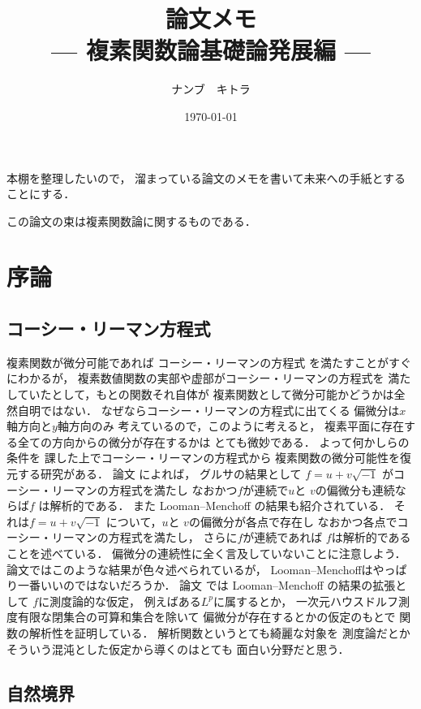 \documentclass[leqno, a4paper, 12pt]{jsarticle}
\title{論文メモ
\large{\\--- 複素関数論基礎論発展編 ---}
}
\author{ナンブ　キトラ}
\date{\today}
\begin{document}
\maketitle

本棚を整理したいので，
溜まっている論文のメモを書いて未来への手紙とすることにする．



この論文の束は複素関数論に関するものである．

\section{序論}

\subsection{コーシー・リーマン方程式}
複素関数が微分可能であれば
コーシー・リーマンの方程式
を満たすことがすぐにわかるが，
複素数値関数の実部や虚部がコーシー・リーマンの方程式を
満たしていたとして，もとの関数それ自体が
複素関数として微分可能かどうかは全然自明ではない．
なぜならコーシー・リーマンの方程式に出てくる
偏微分は$x$軸方向と$y$軸方向のみ
考えているので，このように考えると，
複素平面に存在する全ての方向からの微分が存在するかは
とても微妙である．
よって何かしらの条件を
課した上でコーシー・リーマンの方程式から
複素関数の微分可能性を復元する研究がある．
論文\cite{MR0470179}
によれば，
グルサの結果として
$f=u+v\sqrt{-1}$
がコーシー・リーマンの方程式を満たし
なおかつ$f$が連続で$u$と
$v$の偏微分も連続ならば$f$
は解析的である．
また
Looman--Menchoff
の結果も紹介されている．
それは$f=u+v\sqrt{-1}$
について，$u$と
$v$の偏微分が各点で存在し
なおかつ各点でコーシー・リーマンの方程式を満たし，
さらに$f$が連続であれば
$f$は解析的であることを述べている．
偏微分の連続性に全く言及していないことに注意しよう．
論文\cite{MR0470179}ではこのような結果が色々述べられているが，
Looman--Menchoffはやっぱり一番いいのではないだろうか．
論文
\cite{MR1057270}
では
Looman--Menchoff
の結果の拡張として
$f$に測度論的な仮定，
例えばある$L^{p}$に属するとか，
一次元ハウスドルフ測度有限な閉集合の可算和集合を除いて
偏微分が存在するとかの仮定のもとで
関数の解析性を証明している．
解析関数というとても綺麗な対象を
測度論だとかそういう混沌とした仮定から導くのはとても
面白い分野だと思う．



\subsection{自然境界}
\end{document}
